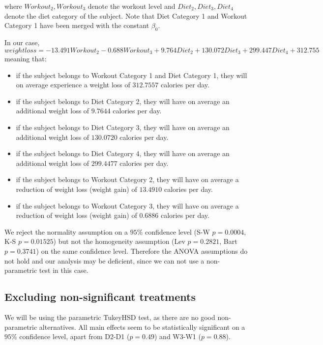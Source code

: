 \documentclass[12pt, a4paper]{article}
\begin{document}
	
	where $Workout_2, Workout_3$ denote the workout level and $Diet_2, Diet_3, Diet_4$ denote the diet category of the subject.  Note that Diet Category 1 and Workout Category 1 have been merged with the constant $\beta_0$.
	
	In our case, 
	$$
	weightloss = - 13.491 Workout_2 - 0.688  Workout_3 + 9.764 Diet_2 + 130.072 Diet_3 + 299.447 Diet_4 + 312.755
	$$ 
	meaning that:
	
	\begin{itemize}
		\item if the subject belongs to Workout Category 1 and Diet Category 1, they will on average experience a weight loss of $312.7557$ calories per day. 
		
		\item if the subject belongs to Diet Category 2, they will have on average an additional weight loss of $9.7644$ calories per day.
		
		\item if the subject belongs to Diet Category 3, they will have on average an additional weight loss of $130.0720$ calories per day.
		
		\item if the subject belongs to Diet Category 4, they will have on average an additional weight loss of $299.4477$ calories per day.
		
		\item if the subject belongs to Workout Category 2, they will have on average a reduction of weight loss (weight gain) of $13.4910$ calories per day.
		
		\item if the subject belongs to Workout Category 3, they will have on average a reduction of weight loss (weight gain) of $0.6886$ calories per day.
	\end{itemize}
	
	We reject the normality assumption on a $95\%$ confidence level (S-W $p=0.0004$, K-S $p=0.01525$) but not the homogeneity assumption (Lev $p=0.2821$, Bart $p=0.3741$) on the same confidence level. Therefore the ANOVA assumptions do not hold and our analysis may be deficient, since we can not use a non-parametric test in this case.
	
	
	
	
	\subsection{Excluding non-significant treatments}
	We will be using the parametric TukeyHSD test, as there are no good non-parametric alternatives. All main effects seem to be statistically significant on a $95\%$ confidence level, apart from D2-D1 ($p=0.49$) and W3-W1 ($p=0.88$).
	
\end{document}
